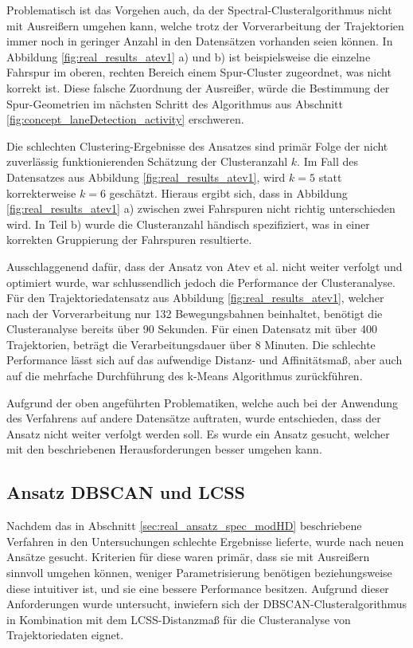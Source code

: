 Problematisch ist das Vorgehen auch, da der Spectral-Clusteralgorithmus nicht mit Ausreißern umgehen kann,
welche trotz der Vorverarbeitung der Trajektorien immer noch in geringer Anzahl in den Datensätzen vorhanden seien können.
In Abbildung \ref{fig:real_results_atev1} a) und b) ist beispielsweise die einzelne Fahrspur im oberen, rechten Bereich
einem Spur-Cluster zugeordnet, was nicht korrekt ist.
Diese falsche Zuordnung der Ausreißer, würde die Bestimmung der Spur-Geometrien im nächsten Schritt des
Algorithmus aus Abschnitt \ref{fig:concept_laneDetection_activity} erschweren.

Die schlechten Clustering-Ergebnisse des Ansatzes sind primär Folge der nicht zuverlässig funktionierenden Schätzung
der Clusteranzahl $k$. Im Fall des Datensatzes aus Abbildung \ref{fig:real_results_atev1}, wird $k = 5$
statt korrekterweise $k = 6$ geschätzt. Hieraus ergibt sich, dass in Abbildung \ref{fig:real_results_atev1} a)
zwischen zwei Fahrspuren nicht richtig unterschieden wird. In Teil b) wurde die Clusteranzahl händisch spezifiziert,
was in einer korrekten Gruppierung der Fahrspuren resultierte.

Ausschlaggenend dafür, dass der Ansatz von Atev et al. nicht weiter verfolgt und optimiert wurde, war schlussendlich
jedoch die Performance der Clusteranalyse. Für den Trajektoriedatensatz aus Abbildung \ref{fig:real_results_atev1},
welcher nach der Vorverarbeitung nur 132 Bewegungsbahnen beinhaltet, benötigt die Clusteranalyse bereits über
90 Sekunden. Für einen Datensatz mit über 400 Trajektorien, beträgt die Verarbeitungsdauer über 8 Minuten.
Die schlechte Performance lässt sich auf das aufwendige Distanz- und Affinitätsmaß, aber auch auf die mehrfache
Durchführung des k-Means Algorithmus zurückführen.

Aufgrund der oben angeführten Problematiken, welche auch bei der Anwendung des Verfahrens auf andere Datensätze auftraten,
wurde entschieden, dass der Ansatz nicht weiter verfolgt werden soll.
Es wurde ein Ansatz gesucht, welcher mit den beschriebenen Herausforderungen besser umgehen kann.

\subsection[DBSCAN und LCSS]{Ansatz DBSCAN und LCSS}
\label{sec:real_ansatz_dbscan_lcss}

Nachdem das in Abschnitt \ref{sec:real_ansatz_spec_modHD} beschriebene Verfahren in
den Untersuchungen schlechte Ergebnisse lieferte, wurde nach neuen Ansätze gesucht.
Kriterien für diese waren primär, dass sie mit Ausreißern sinnvoll umgehen können, weniger Parametrisierung
benötigen beziehungsweise diese intuitiver ist, und sie eine bessere Performance besitzen.
Aufgrund dieser Anforderungen wurde untersucht, inwiefern sich der DBSCAN-Clusteralgorithmus
in Kombination mit dem LCSS-Distanzmaß für die Clusteranalyse von Trajektoriedaten eignet.

